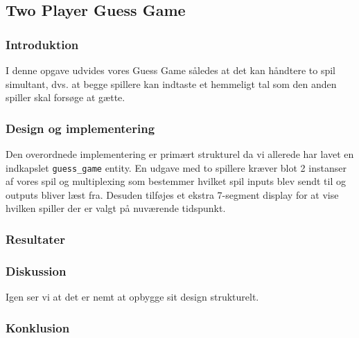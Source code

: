 {
    \newcommand{\labelprefix}{src5-2}

    \subsection{Two Player Guess Game}

    \subsubsection{Introduktion}

    I denne opgave udvides vores Guess Game således at det kan håndtere to spil simultant, dvs. at begge spillere kan indtaste et hemmeligt tal som den anden spiller skal forsøge at gætte.

    \subsubsection{Design og implementering}

    Den overordnede implementering er primært strukturel da vi allerede har lavet en indkapslet \texttt{guess\_game} entity.
    En udgave med to spillere kræver blot 2 instanser af vores spil og multiplexing som bestemmer hvilket spil inputs blev sendt til og outputs bliver læst fra.
    Desuden tilføjes et ekstra 7-segment display for at vise hvilken spiller der er valgt på nuværende tidspunkt.

    \subsubsection{Resultater}


    \subsubsection{Diskussion}

    Igen ser vi at det er nemt at opbygge sit design strukturelt.

    \subsubsection{Konklusion}
    
}